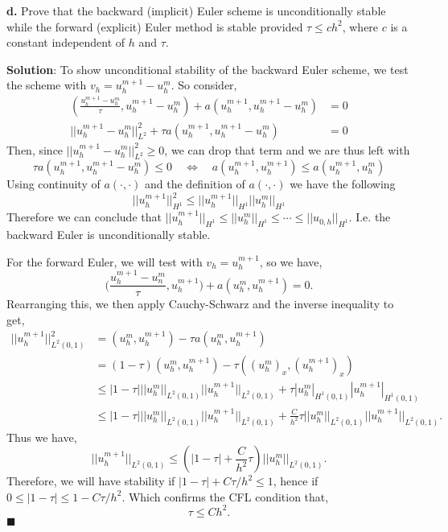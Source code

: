 \documentclass[11pt]{article}
\begin{document}
\vskip 2cm




{\bf d.} Prove that the backward (implicit) Euler scheme is unconditionally stable while the forward (explicit) Euler method is stable provided $\tau \leq ch^2$, where $c$ is a constant independent of $h$ and $\tau$.


\vskip 1cm

{\bf Solution}: To show unconditional stability of the backward Euler scheme, we test the scheme with $v_h = u_h^{m+1} - u_h^m$. So consider, 
\begin{align*}
(\frac{u_h^{m+1} - u_h^m}{\tau},  u_h^{m+1} - u_h^m) + a(u^{m+1}_h,  u_h^{m+1} - u_h^m) &= 0 \\ 
||u_h^{m+1} - u_h^m ||^2_{L^2} + \tau a(u^{m+1}_h, u^{m+1}_h - u^m_h) &=  0
\end{align*}
Then, since $||u_h^{m+1} - u_h^m ||^2_{L^2} \geq 0$, we can drop that term and we are thus left with 
\[ \tau a(u^{m+1}_h, u^{m+1}_h - u^m_h) \leq  0 \quad \Leftrightarrow \quad a(u^{m+1}_h, u^{m+1}_h) \leq a(u^{m+1}_h, u^m_h ) \]
Using continuity of $a(\cdot, \cdot)$ and the definition of $a(\cdot, \cdot)$ we have the following
\begin{equation*}
||u^{m+1}_h ||^2_{H^1} \leq ||u^{m+1}_h ||_{H^1} ||u^m_h ||_{H^1}
\end{equation*}
Therefore we can conclude that $||u^{m+1}_h||_{H^1} \leq ||u^m_h||_{H^1} \leq \cdots \leq ||u_{0,h} ||_{H^1}$. I.e. the backward Euler is unconditionally stable. 

For the forward Euler, we will test with $v_h = u_h^{m+1}$, so we have,
\begin{equation*}
    \big(\frac{u^{m+1}_h - u^m_n}{\tau}, u^{m+1}_h \big) + a(u^m_h, u^{m+1}_h) = 0.
\end{equation*}
Rearranging this, we then apply Cauchy-Schwarz and the inverse inequality to get,
\begin{align*}
    ||u^{m+1}_h||^2_{L^2(0,1)} &= (u^m_h, u^{m+1}_h) - \tau a(u^m_h, u^{m+1}_h) \\
    &= (1 - \tau) (u^m_h, u^{m+1}_h) - \tau ( (u^m_h)_x, (u^{m+1}_h)_x ) \\
    &\leq |1 - \tau| ||u^m_h||_{L^2(0,1)} ||u^{m+1}_h||_{L^2(0,1)} + \tau |u^m_h|_{H^1(0,1)} |u^{m+1}_h|_{H^1(0,1)} \\
    &\leq |1 - \tau| ||u^m_h||_{L^2(0,1)} ||u^{m+1}_h||_{L^2(0,1)} + \frac{C}{h^2} \tau ||u^m_h||_{L^2(0,1)} ||u^{m+1}_h||_{L^2(0,1)}.
\end{align*}
Thus we have,
\begin{equation*}
    ||u^{m+1}_h||_{L^2(0,1)} \leq (|1 - \tau| + \frac{C}{h^2} \tau ) ||u^m_h||_{L^2(0,1)}.
\end{equation*}
Therefore, we will have stability if $|1-\tau| + C\tau/h^2 \leq 1$, hence if $0 \leq |1 - \tau| \leq 1 - C\tau/h^2$.
Which confirms the CFL condition that,
\begin{equation*}
    \tau \leq Ch^2.
\end{equation*}
$\blacksquare$
\end{document}
